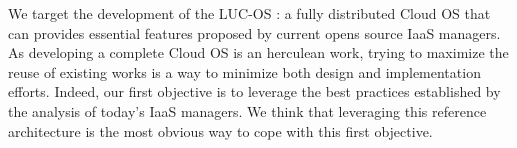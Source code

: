 We target the development of the LUC-OS : a fully distributed Cloud OS that can 
provides essential features proposed by current opens source IaaS managers. As
developing a complete Cloud OS is an herculean work, trying to maximize the 
reuse of existing works is a way to minimize both design and implementation 
efforts. Indeed, our first objective is to leverage the best practices 
established by the analysis of today's IaaS managers. We think that leveraging
this reference architecture is the most obvious way to cope with this first
objective.
